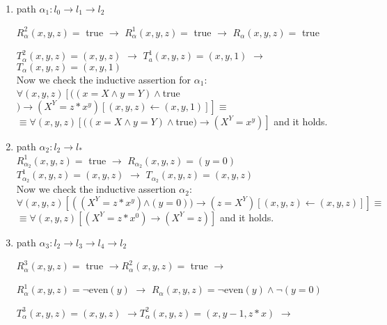 \documentclass{article}
\begin{document}
\begin{enumerate}


 \item path $\alpha_1: l_0 \rightarrow l_1 \rightarrow l_2$ 

$R_\alpha^2(x, y, z)=$ true $\rightarrow$
$R_\alpha^1(x, y, z)=$ true $\rightarrow$
$R_\alpha(x, y, z)=$ true 

$T_\alpha^2(x, y, z)=(x, y, z)$ $\rightarrow$
$T_a^1(x, y, z)=(x, y, 1)$ $\rightarrow$
$T_\alpha(x, y, z)=(x, y, 1)$ \\

Now we check the inductive assertion for $\alpha_1$: \\
$\forall(x, y, z)\left[((x=X \wedge y=Y) \wedge\right.$true$\left.) \rightarrow\left(X^Y=z*x^y \right)[(x, y, z) \leftarrow(x, y, 1)]\right] \equiv$ \\
$\equiv \forall(x, y, z) \left[((x=X \wedge y=Y) \wedge\right.$true$\left.) \rightarrow\left(X^Y=x^y \right) \right]$ and it holds.
\\

 \item path $\alpha_2: l_2 \rightarrow l_*$ \\
$R_{\alpha_2}^1(x, y, z)=$ true $\rightarrow$ 
$R_{\alpha_2}(x, y, z)= (y=0)$  \\
$T_{\alpha_2}^1(x, y, z)=(x, y, z)$ $\rightarrow$
$T_{\alpha_2}(x, y, z)=(x, y, z)$ \\

Now we check the inductive assertion $\alpha_2$: \\
$\forall(x, y, z)\left[\left(\left(X^Y=z*x^y \right)\right.\right.\left.\wedge(y=0)) \rightarrow\left(z=X^Y \right)[(x, y, z) \leftarrow(x, y, z)]\right] \equiv$ \\
$\equiv \forall(x, y, z)\left[\left(X^Y=z*x^0 \right) \rightarrow\left(X^Y=z \right) \right]$ and it holds.


 \item  path $\alpha_3: l_2 \rightarrow l_3 \rightarrow l_4 \rightarrow l_2$ 

$R_\alpha^3(x, y, z)=$ true $\rightarrow R_\alpha^2(x, y, z)=$ true $\rightarrow$ 

$R_\alpha^1(x, y, z)= \neg \text{even}(y)$ $\rightarrow$
$R_\alpha(x, y, z)= \neg \text{even}(y) \wedge \neg (y=0)$

\vspace{5mm}

$T_\alpha^3(x, y, z)=(x, y, z)$ $\rightarrow
T_\alpha^2(x, y, z)=(x,y-1,z*x)$ $\rightarrow$


\end{enumerate}
\end{document}
